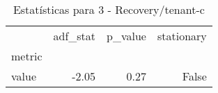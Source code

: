 \begin{table}[htbp]
\caption{Estatísticas para 3 - Recovery/tenant-c}
\label{tab:3_-_recovery_tenant-c_adf_test}
\begin{tabular}{lrrr}
\toprule
 & adf_stat & p_value & stationary \\
metric &  &  &  \\
\midrule
value & -2.05 & 0.27 & False \\
\bottomrule
\end{tabular}
\end{table}
